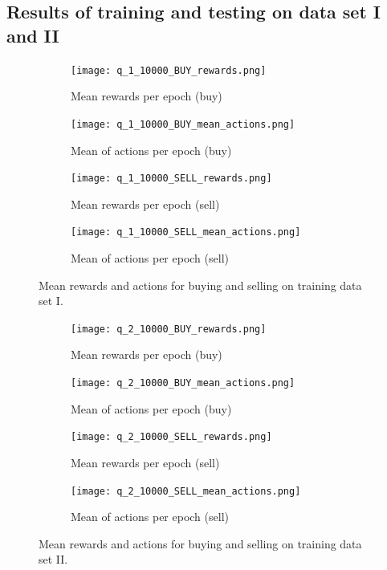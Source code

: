 \subsection{Results of training and testing on data set I and II}

\begin{figure}
    \centering
    \begin{subfigure}[b]{0.4\textwidth}
        \texttt{[image: q\_1\_10000\_BUY\_rewards.png]}
        \caption{Mean rewards per epoch (buy)}
        \label{fig:analysis-q-learn-1-reward-buy}
    \end{subfigure}
    \begin{subfigure}[b]{0.4\textwidth}
        \texttt{[image: q\_1\_10000\_BUY\_mean\_actions.png]}
        \caption{Mean of actions per epoch (buy)}
        \label{fig:analysis-q-learn-1-action-buy}
    \end{subfigure}
    \begin{subfigure}[b]{0.4\textwidth}
        \texttt{[image: q\_1\_10000\_SELL\_rewards.png]}
        \caption{Mean rewards per epoch (sell)}
        \label{fig:analysis-q-learn-1-reward-sell}
    \end{subfigure}
    \begin{subfigure}[b]{0.4\textwidth}
        \texttt{[image: q\_1\_10000\_SELL\_mean\_actions.png]}
        \caption{Mean of actions per epoch (sell)}
        \label{fig:analysis-q-learn-1-action-sell}
    \end{subfigure}
    \caption{Mean rewards and actions for buying and selling on training data set I.}
    \label{fig:analysis-q-learn-1}
\end{figure}
\begin{figure}
    \centering
    \begin{subfigure}[b]{0.4\textwidth}
        \texttt{[image: q\_2\_10000\_BUY\_rewards.png]}
        \caption{Mean rewards per epoch (buy)}
        \label{fig:analysis-q-learn-2-reward-buy}
    \end{subfigure}
    \begin{subfigure}[b]{0.4\textwidth}
        \texttt{[image: q\_2\_10000\_BUY\_mean\_actions.png]}
        \caption{Mean of actions per epoch (buy)}
        \label{fig:analysis-q-learn-2-action-buy}
    \end{subfigure}
    \begin{subfigure}[b]{0.4\textwidth}
        \texttt{[image: q\_2\_10000\_SELL\_rewards.png]}
        \caption{Mean rewards per epoch (sell)}
        \label{fig:analysis-q-learn-2-reward-sell}
    \end{subfigure}
    \begin{subfigure}[b]{0.4\textwidth}
        \texttt{[image: q\_2\_10000\_SELL\_mean\_actions.png]}
        \caption{Mean of actions per epoch (sell)}
        \label{fig:analysis-q-learn-2-action-sell}
    \end{subfigure}
    \caption{Mean rewards and actions for buying and selling on training data set II.}
    \label{fig:analysis-q-learn-2}
\end{figure}

